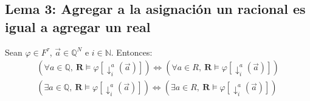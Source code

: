 \documentclass{article}
\begin{document}
\subsection*{Lema 3: Agregar a la asignación un racional es igual a agregar un real}
Sean $\varphi\in F^\tau$, $\vec{a}\in\mathbb{Q}^N$ e $i\in\mathbb{N}$. Entonces:
\begin{equation*}
  \begin{aligned}
    (\forall a\in\mathbb{Q},\ \mathbf{R}\vDash\varphi[\downarrow^a_i(\vec{a})])\iff(\forall a\in R,\ \mathbf{R}\vDash\varphi[\downarrow^a_i(\vec{a})]) \\
    (\exists a\in\mathbb{Q},\ \mathbf{R}\vDash\varphi[\downarrow^a_i(\vec{a})])\iff(\exists a\in R,\ \mathbf{R}\vDash\varphi[\downarrow^a_i(\vec{a})]) \\
  \end{aligned}
\end{equation*}
\end{document}
